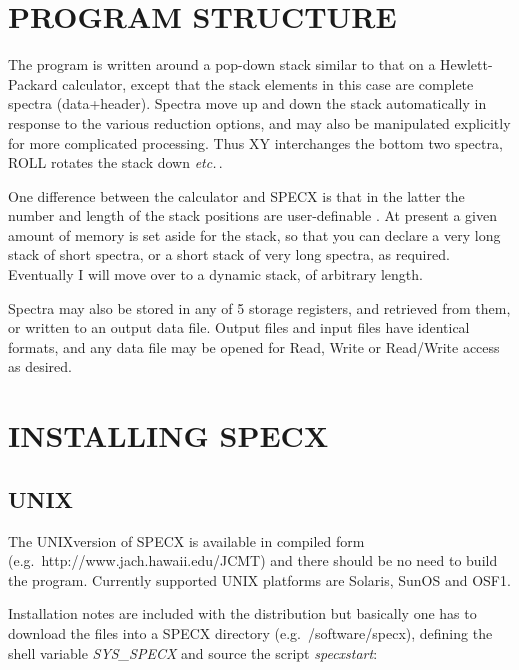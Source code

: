 \documentclass[11pt,twoside]{report}
\newcommand{\etc}{{\it etc.\,}}
\begin{document}
\section{PROGRAM STRUCTURE}

The program is written around a pop-down stack similar to
that on a Hewlett-Packard
calculator, except that the stack
elements in this case are complete spectra (data+header). Spectra move
up and down the stack automatically in response to the various
reduction options, and may also be manipulated explicitly for more
complicated processing. Thus XY interchanges the
bottom two spectra, ROLL rotates the stack down
\etc.

One difference between the calculator and SPECX is that in the latter
the number and length of the stack positions are user-definable
. At present a given amount of memory is set
aside for the stack, so that you can declare a very long stack of
short spectra, or a short stack of very long spectra, as
required. Eventually I will move over to a dynamic stack, of arbitrary
length.

Spectra may also be stored in any of 5 storage registers, and retrieved from them, or written to an output data file. Output
files and input files have identical formats, and any data file may be opened
for Read, Write or Read/Write access as desired.

\section{INSTALLING SPECX}

\subsection{UNIX}

The UNIXversion of SPECX is available in compiled form
(e.g.\ http://www.jach.hawaii.edu/JCMT) and there should be no need
to build the program. Currently supported UNIX platforms are
Solaris, SunOS and OSF1.

Installation notes are included with the distribution but basically
one has to download the files into a SPECX directory (e.g.\
/software/specx), defining the shell variable {\em SYS\_SPECX} and
source the script {\em specxstart}\index{startup file}:
\end{document}

